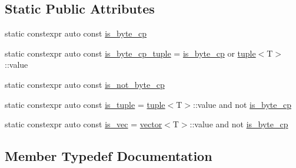 \subsection*{Static Public Attributes}
\begin{DoxyCompactItemize}
\item 
static constexpr auto const \hyperlink{structvt_1_1serialization_1_1_serialization_traits_a38a97b8b969de14ff2893c1ebcb11aba}{is\+\_\+byte\+\_\+cp}
\item 
static constexpr auto const \hyperlink{structvt_1_1serialization_1_1_serialization_traits_a6626e6e387c99e6d67ef3859eb152747}{is\+\_\+byte\+\_\+cp\+\_\+tuple} = \hyperlink{structvt_1_1serialization_1_1_serialization_traits_a38a97b8b969de14ff2893c1ebcb11aba}{is\+\_\+byte\+\_\+cp} or \hyperlink{structvt_1_1serialization_1_1_serialization_traits_ab7e5dd1f060f8077a26dc1c539e7c4fa}{tuple}$<$T$>$\+::value
\item 
static constexpr auto const \hyperlink{structvt_1_1serialization_1_1_serialization_traits_a2cc60efbf5ab3c003a6b7a923794ccac}{is\+\_\+not\+\_\+byte\+\_\+cp}
\item 
static constexpr auto const \hyperlink{structvt_1_1serialization_1_1_serialization_traits_a2a0b40d56694871797b9359f430ec731}{is\+\_\+tuple} = \hyperlink{structvt_1_1serialization_1_1_serialization_traits_ab7e5dd1f060f8077a26dc1c539e7c4fa}{tuple}$<$T$>$\+::value and not \hyperlink{structvt_1_1serialization_1_1_serialization_traits_a38a97b8b969de14ff2893c1ebcb11aba}{is\+\_\+byte\+\_\+cp}
\item 
static constexpr auto const \hyperlink{structvt_1_1serialization_1_1_serialization_traits_a0b46991287a3bac546754a2332f33a82}{is\+\_\+vec} = \hyperlink{structvt_1_1serialization_1_1_serialization_traits_a44712948817caf3f18d61fba6f6c1a18}{vector}$<$T$>$\+::value and not \hyperlink{structvt_1_1serialization_1_1_serialization_traits_a38a97b8b969de14ff2893c1ebcb11aba}{is\+\_\+byte\+\_\+cp}
\end{DoxyCompactItemize}


\subsection{Member Typedef Documentation}
\mbox{\label{structvt_1_1serialization_1_1_serialization_traits_abb1c9363540c1a2d8b6843f8910df5b4}} 
